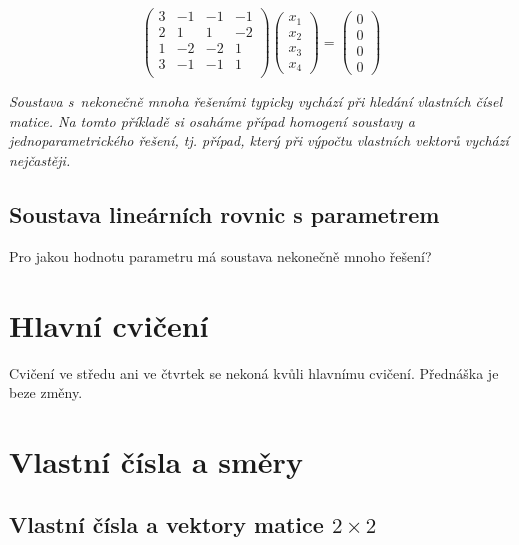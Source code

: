 \begin{equation*}
  \begin{pmatrix}
3 &-1 &-1 &-1\\ 
2 &1 &1 &-2 \\
1 &-2 &-2 &1 \\
3 &-1 &-1 &1 \\
\end{pmatrix}
\begin{pmatrix}
  x_1 \\ x_2 \\x_3\\x_4
\end{pmatrix}
=
\begin{pmatrix}
  0 \\ 0 \\0\\0
\end{pmatrix}
\end{equation*}

\textit{Soustava s nekonečně mnoha řešeními typicky vychází při
  hledání vlastních čísel matice. Na tomto příkladě si osaháme případ
  homogení soustavy a jednoparametrického řešení, tj. případ, který
  při výpočtu vlastních vektorů vychází nejčastěji.}


\subsection{Soustava lineárních rovnic s parametrem}
Pro jakou hodnotu parametru má soustava nekonečně mnoho řešení?

\stranka


\stranka
\section{Hlavní cvičení}
Cvičení ve středu ani ve čtvrtek se nekoná kvůli hlavnímu cvičení. Přednáška je beze změny.


\stranka
\section{Vlastní čísla a směry}



\stranka
\subsection{Vlastní čísla a vektory matice $2\times 2$}

